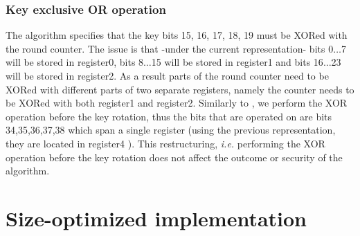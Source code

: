 \documentclass[11pt]{article}
\begin{document}



\subsubsection{Key exclusive OR operation} \label{key_xor}
The algorithm specifies that the key bits 15, 16, 17, 18, 19 must be XORed with the round counter. The issue is that -under the current representation- bits 0$\dots$7 will be stored in register0, bits 8$\dots$15 will be stored in register1 and bits 16$\dots$23 will be stored in register2. As a result parts of the round counter need to be XORed with different parts of two separate registers, namely the counter needs to be XORed with both register1 and register2. Similarly to \cite{eisenbarth2012compact}, we perform the XOR operation before the key rotation, thus the bits that are operated on are bits 34,35,36,37,38 which span a single register (using the previous representation, they are located in register4 ). This restructuring, \emph{i.e.} performing the XOR operation before the key rotation does not affect the outcome or security of the algorithm. 



\section{Size-optimized implementation}
\end{document}
